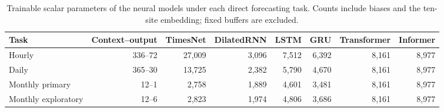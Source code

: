 \begin{table}[!t]
\centering
\caption{Trainable scalar parameters of the neural models under each direct
forecasting task. Counts include biases and the ten-site embedding; fixed
buffers are excluded.}
\label{tab:model_capacity}
\footnotesize
\setlength{\tabcolsep}{5pt}
\renewcommand{\arraystretch}{1.10}
\begin{tabular}{@{}lrrrrrrr@{}}
\toprule
\textbf{Task} & \textbf{Context--output} & \textbf{TimesNet} &
\textbf{DilatedRNN} & \textbf{LSTM} & \textbf{GRU} &
\textbf{Transformer} & \textbf{Informer} \\
\midrule
Hourly & 336--72 & 27,009 & 3,096 & 7,512 & 6,392 & 8,161 & 8,977 \\
Daily & 365--30 & 13,725 & 2,382 & 5,790 & 4,670 & 8,161 & 8,977 \\
Monthly primary & 12--1 & 2,758 & 1,889 & 4,601 & 3,481 & 8,161 & 8,977 \\
Monthly exploratory & 12--6 & 2,823 & 1,974 & 4,806 & 3,686 & 8,161 & 8,977 \\
\bottomrule
\end{tabular}
\end{table}
